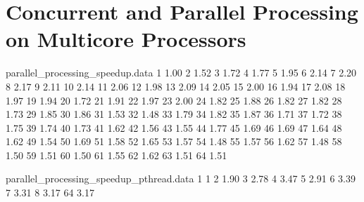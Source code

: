 \section{Concurrent and Parallel Processing on Multicore Processors}

\begin{filecontents}{parallel_processing_speedup.data}
1  1.00
2  1.52
3  1.72
4  1.77
5  1.95
6  2.14
7  2.20
8  2.17
9  2.11
10 2.14
11 2.06
12 1.98
13 2.09
14 2.05
15 2.00
16 1.94
17 2.08
18 1.97
19 1.94
20 1.72
21 1.91
22 1.97
23 2.00
24 1.82
25 1.88
26 1.82
27 1.82
28 1.73
29 1.85
30 1.86
31 1.53
32 1.48
33 1.79
34 1.82
35 1.87
36 1.71
37 1.72
38 1.75
39 1.74
40 1.73
41 1.62
42 1.56
43 1.55
44 1.77
45 1.69
46 1.69
47 1.64
48 1.62
49 1.54
50 1.69
51 1.58
52 1.65
53 1.57
54 1.48
55 1.57
56 1.62
57 1.48
58 1.50
59 1.51
60 1.50
61 1.55
62 1.62
63 1.51
64 1.51
\end{filecontents}

\begin{filecontents}{parallel_processing_speedup_pthread.data}
1  1
2  1.90
3  2.78
4  3.47
5  2.91
6  3.39
7  3.31
8  3.17
64 3.17
\end{filecontents}

